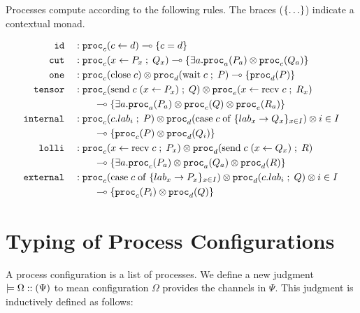 \documentclass[11pt]{article}
\theoremstyle{plain}
\theoremstyle{definition}
\theoremstyle{remark}
\DeclarePairedDelimiter\parens{(}{)}             %
\DeclarePairedDelimiter\braces{\lbrace}{\rbrace} %
\newcommand\indexVar{x}
\newcommand\lolli{\multimap}
\newcommand\lab{lab}
\newcommand\seq{\;;\;}
\newcommand\tbranches[2]{\braces{\lab_\indexVar \rightarrow {#1}_\indexVar}_{\indexVar \in #2}}
\newcommand\tfwd[2]{#1 \leftarrow #2}
\newcommand\tspawn[3]{#1 \leftarrow #2 \seq #3}
\newcommand\tclose[1]{\mathrm{close}\;#1}
\newcommand\twait[2]{\mathrm{wait}\;#1 \seq #2}
\newcommand\tsend[4]{\mathrm{send}\; #1 \; \parens{#2 \leftarrow #3} \seq #4}
\newcommand\trecv[3]{#1 \leftarrow \mathrm{recv} \; #2 \seq #3}
\newcommand\tcase[2]{\mathrm{case}\;#1\;\mathrm{of}\;#2}
\newcommand\tselect[3]{#1 . \lab_{#2} \seq #3}
\newcommand\monad[1]{\braces{#1}}
\newcommand\irb[1]{\texttt{#1}}
\newcommand{\ctx}{\Psi}
\newcommand\proc[2]{\irb{proc}_{#1}\parens{#2}}
\newcommand\provides[2]{\models #1 :: \parens{#2}}
\begin{document}
Processes compute according to the following rules. The braces ($\braces{\ldots}$) indicate a contextual monad.

\begin{align*}
  \irb{id}     \hspace{1em} & : \proc{c}{\tfwd{c}{d}} \lolli \monad{c = d} \\
  \irb{cut}    \hspace{1em} & : \proc{c}{\tspawn{x}{P_x}{Q_x}}
      \lolli \monad{\exists a. \proc{a}{P_a} \otimes \proc{c}{Q_a}} \\
  \irb{one} \hspace{1em} & : \proc{c}{\tclose{c}} \otimes \proc{d}{\twait{c}{P}}
    \lolli \monad{\proc{d}{P}} \\
  \irb{tensor} \hspace{1em} & : \proc{c}{\tsend{c}{x}{P_x}{Q}} \otimes \proc{e}{\trecv{x}{c}{R_x}} \\
    & \hspace{2em} \lolli \monad{ \exists a. \proc{a}{P_{a}} \otimes \proc{c}{Q} \otimes \proc{e}{R_{a}} } \\
  \irb{internal} \hspace{1em} & : \proc{c}{\tselect{c}{i}{P}} \otimes \proc{d}{\tcase{c}{\tbranches Q I}} \otimes i \in I \\
    & \hspace{2em} \lolli \monad{ \proc{c}{P} \otimes \proc{d}{Q_i} } \\
  \irb{lolli} \hspace{1em} & : \proc{c}{\trecv{x}{c}{P_x}} \otimes \proc{d}{\tsend{c}{x}{Q_x}{R}} \\
    & \hspace{2em} \lolli \monad{ \exists a. \proc{c}{P_{a}} \otimes \proc{a}{Q_a} \otimes \proc{d}{R} } \\
  \irb{external} \hspace{1em} & : \proc{c}{\tcase{c}{\tbranches P I}} \otimes \proc{d}{\tselect c i Q} \otimes i \in I \\
    & \hspace{2em} \lolli \monad{ \proc{c}{P_i} \otimes \proc{d}{Q} } \\
\end{align*}


\section{Typing of Process Configurations}

A process configuration is a list of processes. We define a new judgment $\provides{\Omega}{\ctx}$ to mean configuration $\Omega$ provides the channels in $\ctx.$ This judgment is inductively defined as follows:
\end{document}
